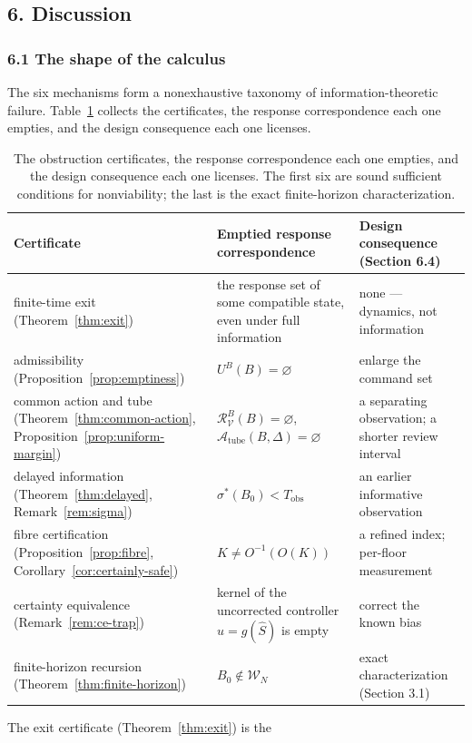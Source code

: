 \documentclass[10pt,twocolumn]{article}
\theoremstyle{definition}
\begin{document}
\subsection{6. Discussion}\label{discussion}


\subsubsection{6.1 The shape of the
calculus}\label{the-shape-of-the-calculus}

The six mechanisms form a nonexhaustive taxonomy of information-theoretic failure. Table~\ref{tab:summary} collects the certificates, the response correspondence each one empties, and the design consequence each one licenses.

\begin{table}[t]
\centering
\footnotesize
\begin{tabular}{@{}l>{\raggedright\arraybackslash}p{3.4cm}>{\raggedright\arraybackslash}p{4.4cm}@{}}
\toprule
Certificate & Emptied response correspondence & Design consequence (Section 6.4) \\
\midrule
finite-time exit (Theorem~\ref{thm:exit}) & the response set of some compatible state, even under full information & none --- dynamics, not information \\
admissibility (Proposition~\ref{prop:emptiness}) & \(U^B(B)=\varnothing\) & enlarge the command set \\
common action and tube (Theorem~\ref{thm:common-action}, Proposition~\ref{prop:uniform-margin}) & \(\mathcal{R}_{\mathcal{V}}^B(B)=\varnothing\), \(\mathcal{A}_{\mathrm{tube}}(B,\Delta)=\varnothing\) & a separating observation; a shorter review interval \\
delayed information (Theorem~\ref{thm:delayed}, Remark~\ref{rem:sigma}) & \(\sigma^*(B_0)<T_{\mathrm{obs}}\) & an earlier informative observation \\
fibre certification (Proposition~\ref{prop:fibre}, Corollary~\ref{cor:certainly-safe}) & \(K\neq O^{-1}(O(K))\) & a refined index; per-floor measurement \\
certainty equivalence (Remark~\ref{rem:ce-trap}) & kernel of the uncorrected controller \(u=g(\hat S)\) is empty & correct the known bias \\
finite-horizon recursion (Theorem~\ref{thm:finite-horizon}) & \(B_0\notin\mathcal{W}_N\) & exact characterization (Section 3.1) \\
\bottomrule
\end{tabular}
\caption{The obstruction certificates, the response correspondence each one empties, and the design consequence each one licenses. The first six are sound sufficient conditions for nonviability; the last is the exact finite-horizon characterization.}
\label{tab:summary}
\end{table} The exit certificate (Theorem~\ref{thm:exit}) is the
\end{document}
